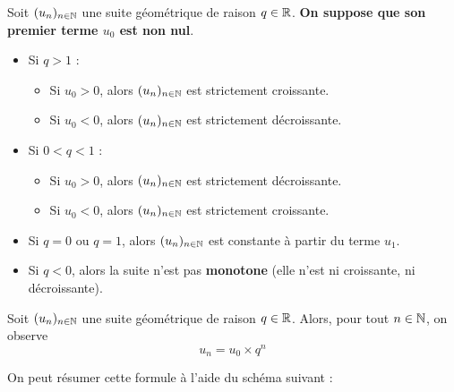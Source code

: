 \documentclass{poly}
\begin{document}
\begin{proposition}
Soit $(u_n)_{n \in \mathbb{N}}$ une suite géométrique de raison $q \in \mathbb{R}$. \textbf{On suppose que son premier terme $u_0$ est non nul}.
\begin{itemize}
\item Si $q > 1$ :
\begin{itemize}
\item Si $u_0 > 0$, alors $(u_n)_{n \in \mathbb{N}}$ est strictement croissante.
\item Si $u_0 < 0$, alors $(u_n)_{n \in \mathbb{N}}$ est strictement décroissante.
\end{itemize}
\item Si $0 < q < 1$ : 
\begin{itemize}
\item Si $u_0 > 0$, alors $(u_n)_{n \in \mathbb{N}}$ est strictement décroissante.
\item Si $u_0 < 0$, alors $(u_n)_{n \in \mathbb{N}}$ est strictement croissante. 
\end{itemize}
\item Si $q = 0$ ou $q = 1$, alors $(u_n)_{n \in \mathbb{N}}$ est constante à partir du terme $u_1$.
\item Si $q < 0$, alors la suite n'est pas \textbf{monotone} (elle n'est ni croissante, ni décroissante).
\end{itemize}
\end{proposition}
\newpage
\begin{proposition}
Soit $(u_n)_{n \in \mathbb{N}}$ une suite géométrique de raison $q \in \mathbb{R}$. Alors, pour tout $n \in \mathbb{N}$, on observe
\begin{equation*}
u_n = u_0 \times q^n
\end{equation*}
\end{proposition}
\begin{remark}
On peut résumer cette formule à l'aide du schéma suivant :
\begin{center}
\end{center}
\end{remark}
\end{document}
